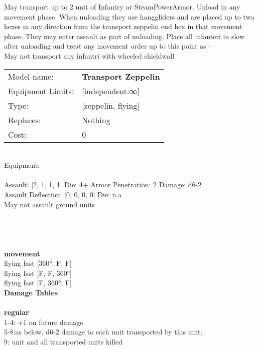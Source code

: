 \noindent May transport up to 2 unit of Infantry or SteamPowerArmor. Unload in any movement phase. When unloading they use hanggliders and are placed up to two hexes in any direction from the transport zeppelin end hex in that movement phase. They may enter assault as part of unloading. Place all infanteri in slow after unloading and treat any movement order up to this point as -\\ 
May not transport any infantri with wheeled shieldwall\\ 


\noindent
\begin{tabular}{ll}
Model name: &{\bf Transport Zeppelin } \\
Equipment Limits: &[independent:∞] \\
Type: &[zeppelin, flying] \\
Replaces: &Nothing \\
Cost: & 0\\
\end{tabular}
\ \\
Equipment:  \\
\ \\
Assault: [2, 1, 1, 1] Die: 4+ Armor Penetration: 2 Damage: d6-2 \\
Assault Deflection: [0, 0, 0, 0] Die: n.a\\
\indent May not assault ground units\\ 
 
\ \\

\ \\
 
\ \\



\ \\ {\bf movement } \\
flying fast [360°, F, F] \\
flying fast [F, F, 360°] \\
flying fast [F, 360°, F] \\


{\bf Damage Tables} \\
\ \\ {\bf regular } \\
1-4: +1 on future damage \\
5-8:as below, d6-2 damage to each unit transported by this unit. \\
9: unit and all transported units killed \\










